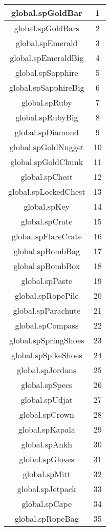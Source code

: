 \begin{center}
    \begin{tabular}{ |c|c| }
        \hline
        global.spGoldBar & 1 \\ \hline
        global.spGoldBars & 2 \\ \hline
        global.spEmerald & 3 \\ \hline
        global.spEmeraldBig & 4 \\ \hline
        global.spSapphire & 5 \\ \hline
        global.spSapphireBig & 6 \\ \hline
        global.spRuby & 7 \\ \hline
        global.spRubyBig & 8 \\ \hline
        global.spDiamond & 9 \\ \hline
        global.spGoldNugget & 10 \\ \hline
        global.spGoldChunk & 11 \\ \hline
        global.spChest & 12 \\ \hline
        global.spLockedChest & 13 \\ \hline
        global.spKey & 14 \\ \hline
        global.spCrate & 15 \\ \hline
        global.spFlareCrate & 16 \\ \hline
        global.spBombBag & 17 \\ \hline
        global.spBombBox & 18 \\ \hline
        global.spPaste & 19 \\ \hline
        global.spRopePile & 20 \\ \hline
        global.spParachute & 21 \\ \hline
        global.spCompass & 22 \\ \hline
        global.spSpringShoes & 23 \\ \hline
        global.spSpikeShoes & 24 \\ \hline
        global.spJordans & 25 \\ \hline
        global.spSpecs & 26 \\ \hline
        global.spUdjat & 27 \\ \hline
        global.spCrown & 28 \\ \hline
        global.spKapala & 29 \\ \hline
        global.spAnkh & 30 \\ \hline
        global.spGloves & 31 \\ \hline
        global.spMitt & 32 \\ \hline
        global.spJetpack & 33 \\ \hline
        global.spCape & 34 \\ \hline
        global.spRopeBag & 35 \\ \hline
    \end{tabular}
\end{center}

